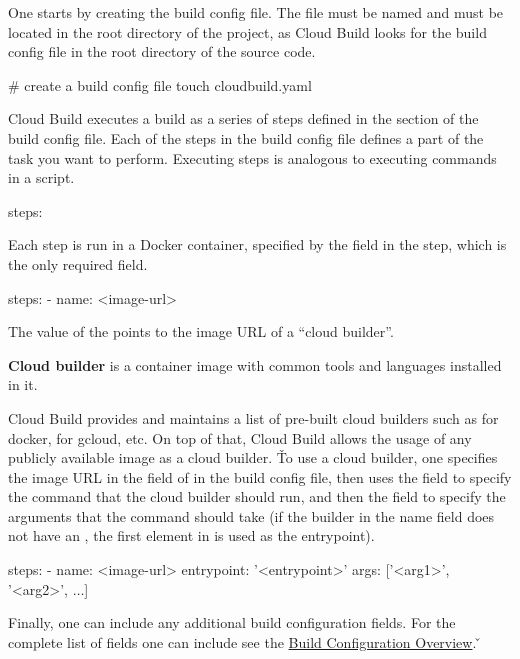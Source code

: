 One starts by creating the build config file. The file must be named  and must be located in the
root directory of the project, as Cloud Build looks for the build config file in the root directory of the source code.
\begin{bash}
# create a build config file
touch cloudbuild.yaml
\end{bash}

Cloud Build executes a build as a series of steps defined in the  section of the build config file. Each
of the steps in the build config file defines a part of the task you want to perform. Executing steps is analogous
to executing commands in a script.
\begin{block}
steps:
\end{block}

Each step is run in a Docker container, specified by the  field in the step, which is the only required
field.
\begin{block}
steps:
    - name: <image-url>
\end{block}

The value of the  points to the image URL of a ``cloud builder''.

\textbf{Cloud builder} is a container image with common tools and languages installed in it.
\ed

Cloud Build provides and maintains a list of pre-built cloud builders such as  for
docker,  for gcloud, etc. On top of that, Cloud Build allows the usage of any
publicly available image as a cloud builder. \v

To use a cloud builder, one specifies the image URL in the  field of  in the build config file,
then uses the  field to specify the command that the cloud builder should run, and then the 
field to specify the arguments that the command should take (if the builder in the name field does not have an
, the first element in  is used as the entrypoint).
\begin{block}
steps:
    - name: <image-url>
      entrypoint: '<entrypoint>'
      args: ['<arg1>', '<arg2>', $\dots$]
\end{block}

Finally, one can include any additional build configuration fields. For the complete list of fields one can include
see the \href{https://cloud.google.com/build/docs/build-config-file-schema}{Build Configuration Overview}. \v

